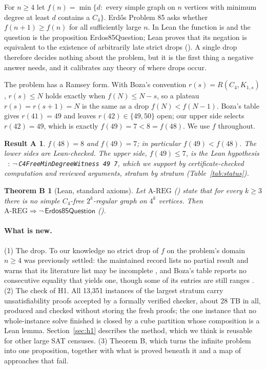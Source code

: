 \documentclass{anvil-paper}
\newcommand{\AREG}{\mathrm{A\text{-}REG}}
\newcommand{\Qn}{\textsf{Erdos85Question}}
\newcommand{\hnoFortyNine}{\lean{hno49}}
\newtheorem*{resultA}{Result A}
\newtheorem*{theoremB}{Theorem B}
\theoremstyle{definition}
\begin{document}
For $n\ge 4$ let $f(n)=\min\{d:$ every simple graph on $n$ vertices with minimum degree at least $d$ contains a $C_4\}$. Erdős Problem 85 \citep{bloom-erdos85} asks whether $f(n+1)\ge f(n)$ for all sufficiently large $n$. In Lean the function is  and the question is the proposition \Qn; Lean proves that its negation is equivalent to the existence of arbitrarily late strict drops (). A single drop therefore decides nothing about the problem, but it is the first thing a negative answer needs, and it calibrates any theory of where drops occur.

The problem has a Ramsey form. With Boza's convention $r(s)=R(C_4,K_{1,s})$ \citep{boza2024ramsey,zhang2017polarity}, $r(s)\le N$ holds exactly when $f(N)\le N-s$, so a plateau $r(s)=r(s+1)=N$ is the same as a drop $f(N)<f(N-1)$. Boza's table gives $r(41)=49$ and leaves $r(42)\in\{49,50\}$ open; our upper side selects $r(42)=49$, which is exactly $f(49)=7<8=f(48)$. We use $f$ throughout.

\begin{resultA}
$f(48)=8$ and $f(49)=7$; in particular $f(49)<f(48)$. The lower sides are Lean-checked. The upper side, $f(49)\le 7$, is the Lean hypothesis \hnoFortyNine\ $:\ \neg\,$\texttt{C4FreeMinDegreeWitness 49 7}, which we support by certificate-checked computation and reviewed arguments, stratum by stratum (Table~\ref{tab:status}).
\end{resultA}

\begin{theoremB}[Lean, standard axioms]
Let $\AREG$ () state that for every $k\ge 3$ there is no simple $C_4$-free $2^k$-regular graph on $4^k$ vertices. Then $\AREG\Rightarrow\neg\,\Qn$ ().
\end{theoremB}

\paragraph{What is new.} (1) The drop. To our knowledge no strict drop of $f$ on the problem's domain $n\ge 4$ was previously settled: the maintained record lists no partial result and warns that its literature list may be incomplete \citep{bloom-erdos85}, and Boza's table reports no consecutive equality that yields one, though some of its entries are still ranges \citep{boza2024ramsey}. (2) The check of H1. All 13,351 instances of the largest stratum carry unsatisfiability proofs accepted by a formally verified checker, about 28 TB in all, produced and checked without storing the fresh proofs; the one instance that no whole-instance solve finished is closed by a cube partition whose composition is a Lean lemma. Section~\ref{sec:h1} describes the method, which we think is reusable for other large SAT censuses. (3) Theorem B, which turns the infinite problem into one proposition, together with what is proved beneath it and a map of approaches that fail.
\end{document}
